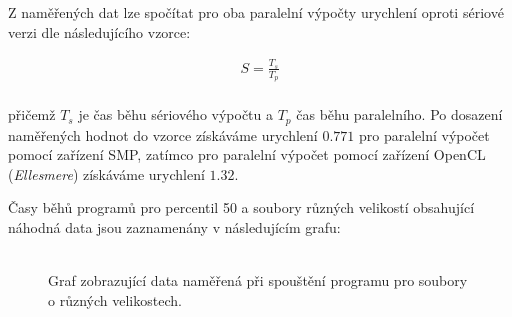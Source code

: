 \documentclass[12pt, a4paper]{article}
\begin{document}
Z naměřených dat lze spočítat pro oba paralelní výpočty urychlení oproti sériové verzi dle následujícího vzorce:

\begin{equation}
    \begin{split}
    S = \frac{T_s}{T_p} \\ 
    \end{split}
\end{equation}

přičemž $T_s$ je čas běhu sériového výpočtu a $T_p$ čas běhu paralelního. 
Po dosazení naměřených hodnot do vzorce získáváme urychlení $0.771$ pro paralelní výpočet pomocí zařízení SMP, zatímco pro paralelní výpočet pomocí zařízení OpenCL (\textit{Ellesmere}) získáváme urychlení $1.32.$

Časy běhů programů pro percentil 50 a soubory různých velikostí obsahující náhodná data jsou zaznamenány v následujícím grafu:
\\
\\
\begin{figure}[!ht]
    \centering
    \caption{Graf zobrazující data naměřená při spouštění programu pro soubory o různých velikostech.}
\end{figure}
\end{document}
